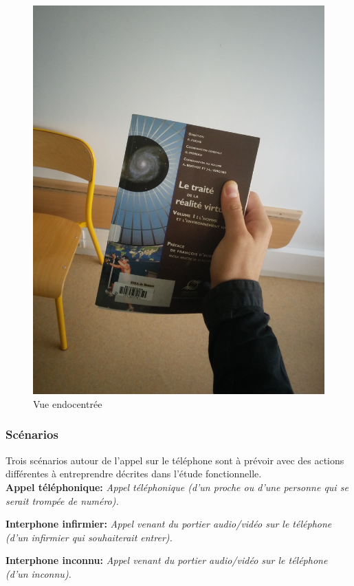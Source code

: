\begin{figure}[h]
\begin{minipage}[b]{0.3\textwidth}
		\includegraphics[width=\linewidth]{3-Planification/img-utilisateur/vue_fps}
		\caption{Vue endocentrée}
		\label{endo}
	\end{minipage}
\end{figure}

\subsubsection{Scénarios}
Trois scénarios autour de l'appel sur le téléphone sont à prévoir avec des actions différentes à entreprendre décrites dans l'étude fonctionnelle. \\

\textbf{Appel téléphonique: }\emph{Appel téléphonique (d'un proche ou d'une personne qui se serait trompée de numéro). }

\textbf{Interphone infirmier: } \emph{Appel venant du portier audio/vidéo sur le téléphone (d'un infirmier qui souhaiterait entrer). }

\textbf{Interphone inconnu: } \emph{Appel venant du portier audio/vidéo sur le téléphone (d'un inconnu). }
